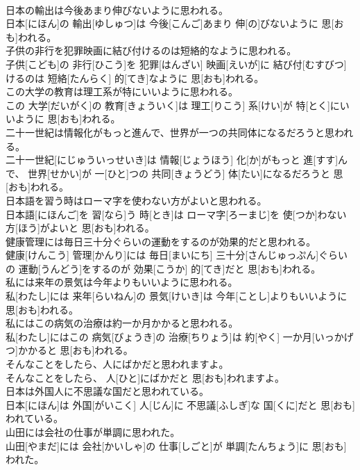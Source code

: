 \documentclass[8pt]{extreport}
\begin{document}
\begin{CJK}{UTF8}{min}
\\	日本の輸出は今後あまり伸びないように思われる。	
\\	日本[にほん]の 輸出[ゆしゅつ]は 今後[こんご]あまり 伸[の]びないように 思[おも]われる。
\\	子供の非行を犯罪映画に結び付けるのは短絡的なように思われる。	
\\	子供[こども]の 非行[ひこう]を 犯罪[はんざい] 映画[えいが]に 結び付[むすびつ]けるのは 短絡[たんらく] 的[てき]なように 思[おも]われる。
\\	この大学の教育は理工系が特にいいように思われる。	
\\	この 大学[だいがく]の 教育[きょういく]は 理工[りこう] 系[けい]が 特[とく]にいいように 思[おも]われる。
\\	二十一世紀は情報化がもっと進んで、世界が一つの共同体になるだろうと思われる。	
\\	二十一世紀[にじゅういっせいき]は 情報[じょうほう] 化[か]がもっと 進[すす]んで、 世界[せかい]が 一[ひと]つの 共同[きょうどう] 体[たい]になるだろうと 思[おも]われる。
\\	日本語を習う時はローマ字を使わない方がよいと思われる。	
\\	日本語[にほんご]を 習[なら]う 時[とき]は ローマ字[ろーまじ]を 使[つか]わない 方[ほう]がよいと 思[おも]われる。
\\	健康管理には毎日三十分ぐらいの運動をするのが効果的だと思われる。	
\\	健康[けんこう] 管理[かんり]には 毎日[まいにち] 三十分[さんじゅっぷん]ぐらいの 運動[うんどう]をするのが 効果[こうか] 的[てき]だと 思[おも]われる。
\\	私には来年の景気は今年よりもいいように思われる。	
\\	私[わたし]には 来年[らいねん]の 景気[けいき]は 今年[ことし]よりもいいように 思[おも]われる。
\\	私にはこの病気の治療は約一か月かかると思われる。	
\\	私[わたし]にはこの 病気[びょうき]の 治療[ちりょう]は 約[やく] 一か月[いっかげつ]かかると 思[おも]われる。
\\	そんなことをしたら、人にばかだと思われますよ。	
\\	そんなことをしたら、 人[ひと]にばかだと 思[おも]われますよ。
\\	日本は外国人に不思議な国だと思われている。	
\\	日本[にほん]は 外国[がいこく] 人[じん]に 不思議[ふしぎ]な 国[くに]だと 思[おも]われている。
\\	山田には会社の仕事が単調に思われた。	
\\	山田[やまだ]には 会社[かいしゃ]の 仕事[しごと]が 単調[たんちょう]に 思[おも]われた。

\end{CJK}
\end{document}
